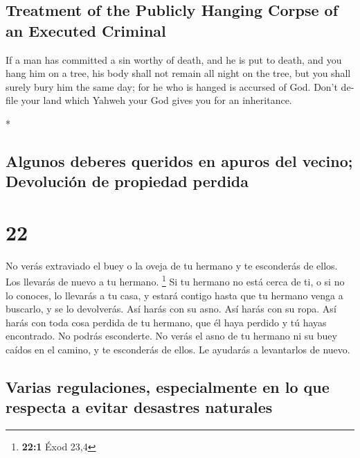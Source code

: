 \begin{paracol}{2}
\begin{otherlanguage}{english}
\hypertarget{treatment-of-the-publicly-hanging-corpse-of-an-executed-criminal}{%
\subsection{Treatment of the Publicly Hanging Corpse of an Executed
Criminal}\label{treatment-of-the-publicly-hanging-corpse-of-an-executed-criminal}}

 If a man has committed a sin worthy of death, and he is
put to death, and you hang him on a tree,  his body shall
not remain all night on the tree, but you shall surely bury him the same
day; for he who is hanged is accursed of God. Don't defile your land
which Yahweh your God gives you for an inheritance.

\end{otherlanguage}

\switchcolumn[0]*

\hypertarget{algunos-deberes-queridos-en-apuros-del-vecino-devoluciuxf3n-de-propiedad-perdida}{%
\subsection{Algunos deberes queridos en apuros del vecino; Devolución de
propiedad
perdida}\label{algunos-deberes-queridos-en-apuros-del-vecino-devoluciuxf3n-de-propiedad-perdida}}

\hypertarget{section-42}{%
\section{22}\label{section-42}}

 No verás extraviado el buey o la oveja de tu hermano y te
esconderás de ellos. Los llevarás de nuevo a tu hermano. \footnote{\textbf{22:1}
  Éxod 23,4}  Si tu hermano no está cerca de ti, o si no
lo conoces, lo llevarás a tu casa, y estará contigo hasta que tu hermano
venga a buscarlo, y se lo devolverás.  Así harás con su
asno. Así harás con su ropa. Así harás con toda cosa perdida de tu
hermano, que él haya perdido y tú hayas encontrado. No podrás
esconderte.  No verás el asno de tu hermano ni su buey
caídos en el camino, y te esconderás de ellos. Le ayudarás a levantarlos
de nuevo.

\hypertarget{varias-regulaciones-especialmente-en-lo-que-respecta-a-evitar-desastres-naturales}{%
\subsection{Varias regulaciones, especialmente en lo que respecta a
evitar desastres
naturales}\label{varias-regulaciones-especialmente-en-lo-que-respecta-a-evitar-desastres-naturales}}


\end{paracol}
